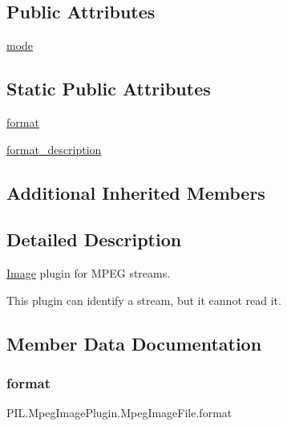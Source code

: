 \subsection*{Public Attributes}
\begin{DoxyCompactItemize}
\item 
\hyperlink{classPIL_1_1MpegImagePlugin_1_1MpegImageFile_a6e3ed071a33e1c7cf19ddb2d8195a25f}{mode}
\end{DoxyCompactItemize}
\subsection*{Static Public Attributes}
\begin{DoxyCompactItemize}
\item 
\hyperlink{classPIL_1_1MpegImagePlugin_1_1MpegImageFile_a3dd019d6c6f2e80edc47b6a45024a7b4}{format}
\item 
\hyperlink{classPIL_1_1MpegImagePlugin_1_1MpegImageFile_ae13f74d73643a814b7ffc2ef03ab7c8f}{format\+\_\+description}
\end{DoxyCompactItemize}
\subsection*{Additional Inherited Members}


\subsection{Detailed Description}
\hyperlink{namespacePIL_1_1Image}{Image} plugin for M\+P\+EG streams. 

This plugin can identify a stream, but it cannot read it. 

\subsection{Member Data Documentation}
\mbox{\label{classPIL_1_1MpegImagePlugin_1_1MpegImageFile_a3dd019d6c6f2e80edc47b6a45024a7b4}} 
\subsubsection{\texorpdfstring{format}{format}}
{\footnotesize\ttfamily P\+I\+L.\+Mpeg\+Image\+Plugin.\+Mpeg\+Image\+File.\+format\hspace{0.3cm}{\ttfamily [static]}}

